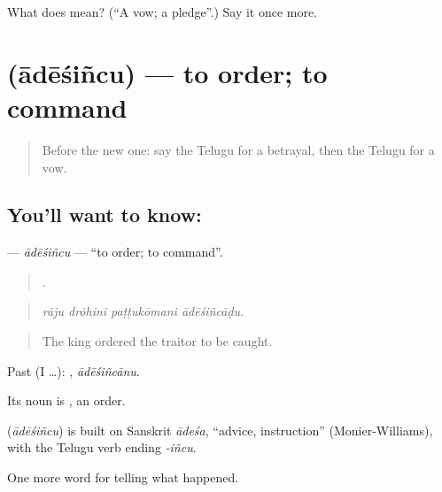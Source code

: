 \begin{tcolorbox}[breakable,colback=teal!4,colframe=teal!35!black,title={Before you move on}]
What does  mean? (\textquotedblleft{}A vow; a pledge\textquotedblright{}.) Say it once more.
\end{tcolorbox}
\section[\texorpdfstring{\te{ఆదేశించు} (ādēśiñcu)}{ఆదేశించు (ādēśiñcu)}]{ (ādēśiñcu) — to order; to command}

\label{lesson:TE-C365-adesincu}



\begin{quote}
Before the new one: say the Telugu for a betrayal, then the Telugu for a vow.
\end{quote}

\subsection*{You'll want to know: }
\textbf{} — \emph{ādēśiñcu} — \textquotedblleft{}to order; to command\textquotedblright{}.

\begin{quote}
   .
\end{quote}

\begin{quote}
\emph{rāju drōhini paṭṭukōmani ādēśiñcāḍu.}
\end{quote}

\begin{quote}
The king ordered the traitor to be caught.
\end{quote}

Past (I …): , \emph{ādēśiñcānu}.

Its noun is , an order.

\begin{cousinweb}
\textbf{} (\emph{ādēśiñcu}) is built on Sanskrit \emph{ādeśa}, \textquotedblleft{}advice, instruction\textquotedblright{} (Monier-Williams), with the Telugu verb ending \emph{-iñcu}.
\end{cousinweb}

\begin{grammarlens}[title={What you've built}]
One more word for telling what happened.
\end{grammarlens}

